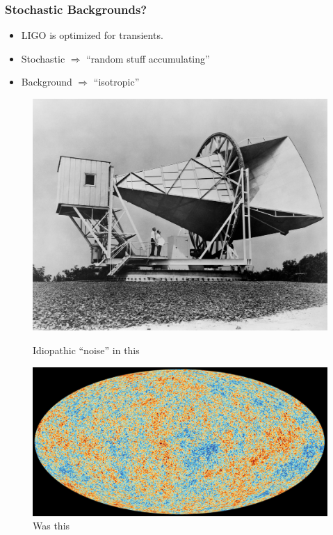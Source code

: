 \documentclass[10pt]{beamer}
\begin{document}
\begin{frame}
  \frametitle{Stochastic Backgrounds?}
  \begin{itemize}
  \item LIGO is optimized for transients.
  \item Stochastic $\Rightarrow$ ``random stuff accumulating''
  \item Background $\Rightarrow$ ``isotropic''
  \end{itemize}
  \begin{figure}
      \includegraphics[scale=0.15]{detector.jpg}
      \caption{Idiopathic ``noise'' in this}
      \includegraphics[scale=0.05]{cmb.jpg}
      \caption{Was this}
  \end{figure}
\end{frame}
\end{document}
